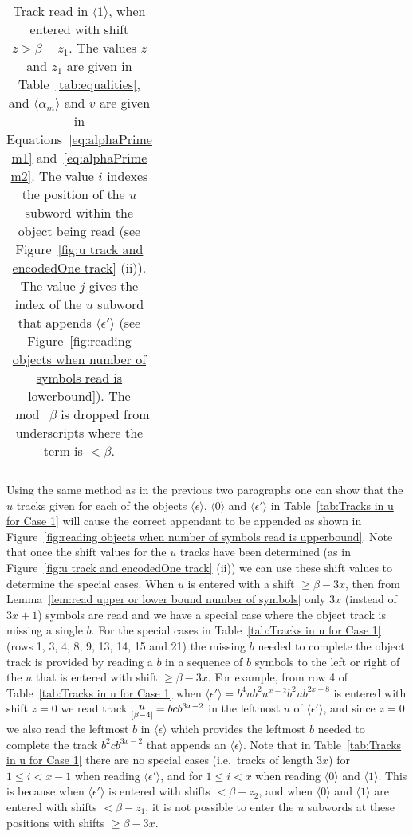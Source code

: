 \documentclass[11pt]{article} \usepackage{amsfonts,amsmath,amssymb,amsthm}
\newcommand{\tne}[1]{\ensuremath{\langle #1\rangle}}
\newcommand{\encodeOne}{\tne{1}}
\newcommand{\encodeZero}{\tne{0}}
\newcommand{\encodeDeletion}{\tne{\epsilon}}
\newcommand{\encodeDeletionTrack}{\ensuremath{b^2cb^{3x-2}}}
\newcommand{\encodeDeletionTrackCaseA}{\ensuremath{bcb^{3x-2}}}
\newcommand{\encodeDeletionPrime}{\tne{\epsilon'}}
\newcommand{\encodeDeletionPrimeSequence}{\ensuremath{b^4ub^2u^{x-2}b^2ub^{2x-8}}}
\newcommand{\track}[2]{\raisebox{2.5pt}{\ensuremath{\underset{[#1]}#2}}}
\begin{document}
\begin{table*}[!ht]
\begin{tabular}{@{}c|l|l@{\;}}
\hline
\end{tabular}
\caption{Track read in $\encodeOne$, when entered with shift $z>\beta-z_1$. The values $z$ and $z_1$ are given in Table~\ref{tab:equalities}, and $\tne{\alpha_m}$ and $v$ are given in Equations~\eqref{eq:alphaPrime m1} and~\eqref{eq:alphaPrime m2}. The value $i$ indexes the position of the $u$ subword within the object being read (see Figure~\ref{fig:u track and encodedOne track} (ii)). The value $j$ gives the index of the $u$ subword that appends $\encodeDeletionPrime$ (see Figure~\ref{fig:reading objects when number of symbols read is lowerbound}). The $\bmod\;\beta$ is dropped from underscripts where the term is  $<\beta$.}\label{tab:Tracks in u for Case 2b}
\end{table*}



Using the same method as in the previous two paragraphs one can show that the $u$ tracks given for each of the objects $\encodeDeletion$, $\encodeZero$ and $\encodeDeletionPrime$ in Table~\ref{tab:Tracks in u for Case 1} will cause the correct appendant to be appended as shown in Figure~\ref{fig:reading objects when number of symbols read is upperbound}. 
Note that once the shift values for the $u$ tracks have been determined (as in Figure~\ref{fig:u track and encodedOne track} (ii)) we can use these shift values to determine the special cases. 
When $u$ is entered with a shift $\geqslant\beta-3x$, then from Lemma~\ref{lem:read upper or lower bound number of symbols} only $3x$ (instead of $3x+1$) symbols are read and we have a special case where the object track is missing a single $b$. 
For the special cases in Table~\ref{tab:Tracks in u for Case 1} (rows 1, 3, 4, 8, 9, 13, 14, 15 and 21) the missing $b$ needed to complete the object track is provided by reading a $b$ in a sequence of $b$ symbols to the left or right of the $u$ that is entered with shift $\geqslant\beta-3x$. 
For example, from row 4 of Table~\ref{tab:Tracks in u for Case 1} when $\encodeDeletionPrime=\encodeDeletionPrimeSequence$ is entered with shift $z=0$ we read track $\track{\beta-4}{u}=\encodeDeletionTrackCaseA$ in the leftmost $u$ of $\encodeDeletionPrime$, and since $z=0$ we also read the leftmost $b$ in $\encodeDeletion$ which provides the leftmost $b$ needed to complete the track $\encodeDeletionTrack$ that appends an $\encodeDeletion$. 
Note that in Table~\ref{tab:Tracks in u for Case 1} there are no special cases (i.e.~tracks of length $3x$) for $1\leqslant i<x-1$ when reading $\encodeDeletionPrime$, and for $1\leqslant i<x$ when reading $\encodeZero$ and $\encodeOne$. 
This is because when $\encodeDeletionPrime$ is entered with shifts $<\beta-z_2$, and when $\encodeZero$ and $\encodeOne$ are entered with shifts $<\beta-z_1$, it is not possible to enter the $u$ subwords at these positions with shifts $\geqslant\beta-3x$.
 
\end{document}
